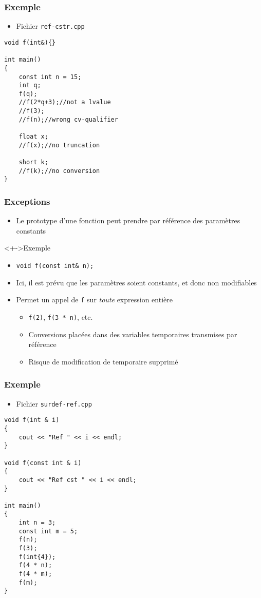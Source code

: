 \begin{frame}[containsverbatim]
\frametitle{Exemple}
\begin{itemize}
\item Fichier \texttt{ref-cstr.cpp}
\end{itemize}
\begin{lstlisting}
void f(int&){}

int main()
{
	const int n = 15;
	int q;
	f(q);
	//f(2*q+3);//not a lvalue
	//f(3);
	//f(n);//wrong cv-qualifier

	float x;
	//f(x);//no truncation

	short k;
	//f(k);//no conversion
}
\end{lstlisting}
\end{frame}

\begin{frame}
\frametitle{Exceptions}
\begin{itemize}[<+->]
\item Le prototype d'une fonction peut prendre par référence des paramètres constants
\end{itemize}
\begin{exampleblock}<+->{Exemple}
	\begin{itemize}[<+->]
	\item \lstinline|void f(const int& n);|
	\end{itemize}
\end{exampleblock}
\begin{itemize}[<+->]
\item Ici, il est prévu que les paramètres soient constants, et donc non modifiables
\item Permet un appel de \texttt{f} sur \emph{toute} expression entière
	\begin{itemize}
	\item \texttt{f(2)}, \texttt{f(3 * n)}, etc.
	\item Conversions placées dans des variables temporaires transmises par référence
	\item Risque de modification de temporaire supprimé
	\end{itemize}
\end{itemize}
\end{frame}

\begin{frame}[containsverbatim]
\frametitle{Exemple}
\begin{itemize}
\item Fichier \texttt{surdef-ref.cpp}
\end{itemize}
\begin{lstlisting}
void f(int & i)
{
	cout << "Ref " << i << endl;
}

void f(const int & i)
{
	cout << "Ref cst " << i << endl;
}

int main()
{
	int n = 3;
	const int m = 5;
	f(n);
	f(3);
	f(int{4});
	f(4 * n);
	f(4 * m);
	f(m);
}
\end{lstlisting}
\end{frame}


